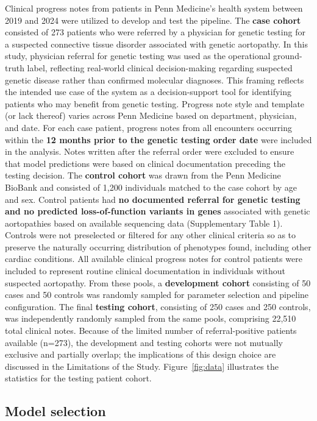 \documentclass[fleqn,10pt]{wlscirep}
\begin{document}
Clinical progress notes from patients in Penn Medicine’s health system between 2019 and 2024 were utilized to develop and test the pipeline. The \textbf{case cohort} consisted of 273 patients who were referred by a physician for genetic testing for a suspected connective tissue disorder associated with genetic aortopathy. In this study, physician referral for genetic testing was used as the operational ground-truth label, reflecting real-world clinical decision-making regarding suspected genetic disease rather than confirmed molecular diagnoses. This framing reflects the intended use case of the system as a decision-support tool for identifying patients who may benefit from genetic testing. Progress note style and template (or lack thereof) varies across Penn Medicine based on department, physician, and date. For each case patient, progress notes from all encounters occurring within the \textbf{12 months prior to the genetic testing order date} were included in the analysis. Notes written after the referral order were excluded to ensure that model predictions were based on clinical documentation preceding the testing decision.
The \textbf{control cohort} was drawn from the Penn Medicine BioBank\cite{verma2022penn} and consisted of 1,200 individuals matched to the case cohort by age and sex. Control patients had \textbf{no documented referral for genetic testing and no predicted loss-of-function variants in genes} associated with genetic aortopathies based on available sequencing data (Supplementary Table 1). Controls were not preselected or filtered for any other clinical criteria so as to preserve the naturally occurring distribution of phenotypes found, including other cardiac conditions. All available clinical progress notes for control patients were included to represent routine clinical documentation in individuals without suspected aortopathy. From these pools, a \textbf{development cohort} consisting of 50 cases and 50 controls was randomly sampled for parameter selection and pipeline configuration. The final \textbf{testing cohort}, consisting of 250 cases and 250 controls, was independently randomly sampled from the same pools, comprising 22,510 total clinical notes. Because of the limited number of referral-positive patients available (n=273), the development and testing cohorts were not mutually exclusive and partially overlap; the implications of this design choice are discussed in the Limitations of the Study. Figure~\ref{fig:data} illustrates the statistics for the testing patient cohort.

\subsection*{Model selection}
\end{document}
